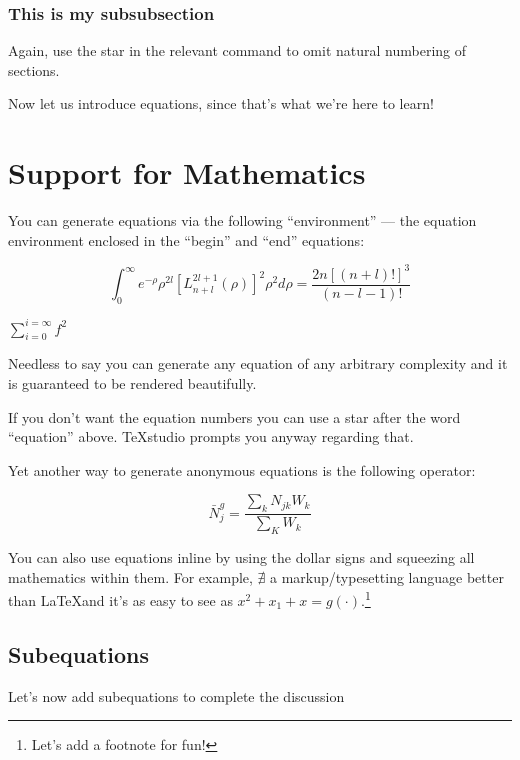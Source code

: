 \documentclass[a4paper,12pt]{article}
\begin{document}
\subsubsection{This is my subsubsection}

Again, use the star in the relevant command to omit natural numbering of sections.

Now let us introduce equations, since that's what we're here to learn!

\section{Support for Mathematics}

You can generate equations via the following ``environment'' --- the 
equation environment enclosed in the ``begin'' and ``end'' equations:

\begin{equation}
\label{Eq:Number_1}
\int_{0}^{\infty} e^{-\rho} \rho^{2l}\left[ L_{n+l}^{2l+1} \left(\rho
\right) \right]^2 \rho^2 d\rho = \frac{2n \left[\left(n+l\right)!
	\right]^3}{(n-l-1)!}
\end{equation}

$\displaystyle\sum_{i=0}^{i=\infty}f^2$

Needless to say you can generate any equation of any arbitrary complexity and it is 
guaranteed to be rendered beautifully.

If you don't want the equation numbers you can use a star after the word 
``equation'' above. TeXstudio prompts you anyway regarding that.

Yet another way to generate anonymous equations is the following operator: %

\[
\bar{N}_j^g = \frac{\sum\limits_{k} N_{jk} W_k}{\sum\limits_{K} W_k}
\]




You can also use equations inline by using the dollar signs and squeezing all
mathematics within them. For example, $\nexists$ a markup/typesetting language
better than \LaTeX  and it's as easy to see as $x^2 + x_1 + x = g(\cdot)$.\footnote{Let's add a footnote for fun!}

\subsection{Subequations}

Let's now add subequations to complete the discussion
\end{document}

